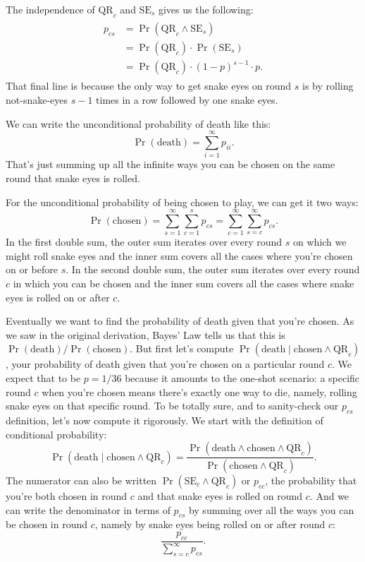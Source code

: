 \documentclass[article,twocolumn]{memoir}
\begin{document}
The independence of $\text{QR}_c$ and $\text{SE}_s$ gives us the following:
\begin{align}\label{pcs}
\begin{split}
p_{cs} & = \Pr(\text{QR}_c\land\text{SE}_s) \\
       & = \Pr(\text{QR}_c)\cdot\Pr(\text{SE}_s) \\
       & = \Pr(\text{QR}_c)\cdot(1-p)^{s-1}\cdot p.
\end{split}
\end{align}
That final line is because the only way to get snake eyes on round $s$ is by rolling not-snake-eyes $s-1$ times in a row followed by one snake eyes.

We can write the unconditional probability of death like this:
\begin{equation}\label{d}
\Pr(\text{death}) = \sum_{i=1}^\infty p_{ii}.
\end{equation}
That's just summing up all the infinite ways you can be chosen on the same round that snake eyes is rolled.

For the unconditional probability of being chosen to play, we can get it two ways:
\begin{equation}\label{c}
\Pr(\text{chosen}) = 
\sum_{s=1}^\infty\sum_{c=1}^s p_{cs} =
\sum_{c=1}^\infty\sum_{s=c}^\infty p_{cs}.
\end{equation}
In the first double sum, the outer sum iterates over every round $s$ on which we might roll snake eyes and the inner sum covers all the cases where you're chosen on or before $s$.
In the second double sum, the outer sum iterates over every round $c$ in which you can be chosen and the inner sum covers all the cases where snake eyes is rolled on or after $c$.

Eventually we want to find the probability of death given that you're chosen.
As we saw in the original derivation, Bayes' Law tells us that this is 
$\Pr(\text{death}) / \Pr(\text{chosen})$.
But first let's compute $\Pr(\text{death}\mid\text{chosen} \land \text{QR}_c)$, your probability of death given that you're chosen on a particular round $c$.
We expect that to be $p=1/36$ because it amounts to the one-shot scenario:
a specific round $c$ when you're chosen means there's exactly one way to die, namely, rolling snake eyes on that specific round.
To be totally sure, and to sanity-check our $p_{cs}$ definition, let's now compute it rigorously.
We start with the definition of conditional probability:
$$
\Pr(\text{death}\mid\text{chosen} \land \text{QR}_c) = 
\frac{\Pr(\text{death}\land\text{chosen}\land\text{QR}_c)}{\Pr(\text{chosen}\land\text{QR}_c)}.
$$
The numerator can also be written $\Pr(\text{SE}_c\land\text{QR}_c)$ or
$p_{cc}$, the probability that you're both chosen in round $c$ and that snake eyes is rolled on round $c$.
And we can write the denominator in terms of $p_{cs}$ by summing over all the ways you can be chosen in round $c$, 
namely by snake eyes being rolled on or after round $c$:
\begin{equation}\label{cc}
\frac{p_{cc}}{\sum\limits_{s=c}^\infty p_{cs}}.
\end{equation}
\end{document}
